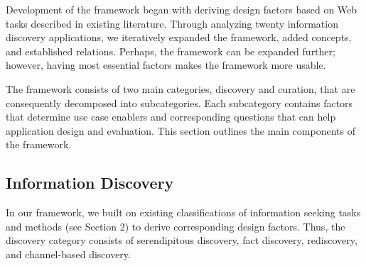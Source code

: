 \documentclass{casconpaper}
\begin{document}
{Development of the framework began with deriving design factors based on Web tasks described in existing literature. Through analyzing twenty information discovery applications, we iteratively expanded the framework, added concepts, and established relations. Perhaps, the framework can be expanded further; however, having most essential factors makes the framework more usable. 

The framework consists of two main categories, discovery and curation, that are consequently decomposed into subcategories. Each subcategory contains factors that determine use case enablers and corresponding questions that can help application design and evaluation. This section outlines the main components of the framework.

} %

{\subsection{Information Discovery}
In our framework, we built on existing classifications of information seeking tasks and methods (see Section 2) to derive corresponding design factors. Thus, the discovery category consists of serendipitous discovery, fact discovery, rediscovery, and channel-based discovery. 
} %
\end{document}
